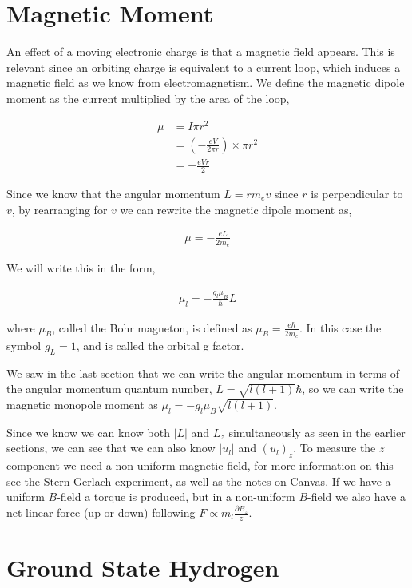 \documentclass[11pt]{amsart}
\begin{document}
\section{Magnetic Moment}

An effect of a moving electronic charge is that a magnetic field appears. This is relevant since an orbiting charge is equivalent to a current loop, which induces a magnetic field as we know from electromagnetism. We define the magnetic dipole moment as the current multiplied by the area of the loop,

\begin{align*}
  \mu &= I \pi r^2 \\
      &= \left(-\frac{eV}{2\pi r}\right) \times \pi r^2 \\
      &= -\frac{eVr}{2}
\end{align*}

Since we know that the angular momentum $L = r m_e v$ since $r$ is perpendicular to $v$, by rearranging for $v$ we can rewrite the magnetic dipole moment as,

\begin{align*}
  \mu = -\frac{eL}{2m_e}
\end{align*}

We will write this in the form,

\begin{align*}
  \mu_l = -\frac{g_l \mu_B}{\hbar} L
\end{align*}

where $\mu_B$, called the Bohr magneton, is defined as $\mu_B = \frac{e\hbar}{2m_e}$. In this case the symbol $g_L = 1$, and is called the orbital g factor.

We saw in the last section that we can write the angular momentum in terms of the angular momentum quantum number, $L = \sqrt{l(l+1)} \hbar$, so we can write the magnetic monopole moment as $\mu_l = -g_l \mu_B \sqrt{l(l+1)}$.

Since we know we can know both $|L|$ and $L_z$ simultaneously as seen in the earlier sections, we can see that we can also know $|u_l|$ and ${(u_l)}_z$. To measure the $z$ component we need a non-uniform magnetic field, for more information on this see the Stern Gerlach experiment, as well as the notes on Canvas. If we have a uniform $B$-field a torque is produced, but in a non-uniform $B$-field we also have a net linear force (up or down) following $F \propto m_l \frac{\partial B_z}{z}$.

\section{Ground State Hydrogen}
\end{document}
